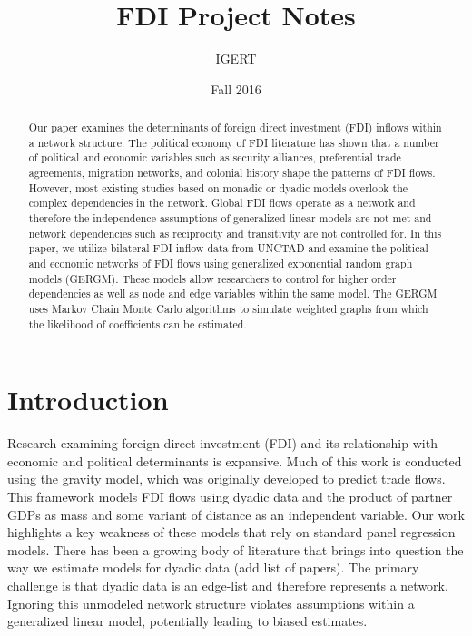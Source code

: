 \documentclass{article}
\begin{document}
\title{FDI Project Notes}
\author{IGERT}
\date{Fall 2016}
\maketitle

\singlespacing
\begin{abstract} 
    \noindent Our paper examines the determinants of foreign direct investment (FDI) inflows within a network structure. The political economy of FDI literature has shown that a number of political and economic variables such as security alliances, preferential trade agreements, migration networks, and colonial history shape the patterns of FDI flows. However, most existing studies based on monadic or dyadic models overlook the complex dependencies in the network. Global FDI flows operate as a network and therefore the independence assumptions of generalized linear models are not met and network dependencies such as reciprocity and transitivity are not controlled for. In this paper, we utilize bilateral FDI inflow data from UNCTAD and examine the political and economic networks of FDI flows using generalized exponential random graph models (GERGM). These models allow researchers to control for higher order dependencies as well as node and edge variables within the same model. The GERGM uses Markov Chain Monte Carlo algorithms to simulate weighted graphs from which the likelihood of coefficients can be estimated.

\end{abstract}

\section{Introduction}

Research examining foreign direct investment (FDI) and its relationship with economic and political determinants is expansive. Much of this work is conducted using the gravity model, which was originally developed to predict trade flows. This framework models FDI flows using dyadic data and the product of partner GDPs as mass and some variant of distance as an independent variable. Our work highlights a key weakness of these models that rely on standard panel regression models. There has been a growing body of literature that brings into question the way we estimate models for dyadic data (add list of papers). The primary challenge is that dyadic data is an edge-list and therefore represents a network. Ignoring this unmodeled network structure violates assumptions within a generalized linear model, potentially leading to biased estimates.
\newpage
\end{document}
